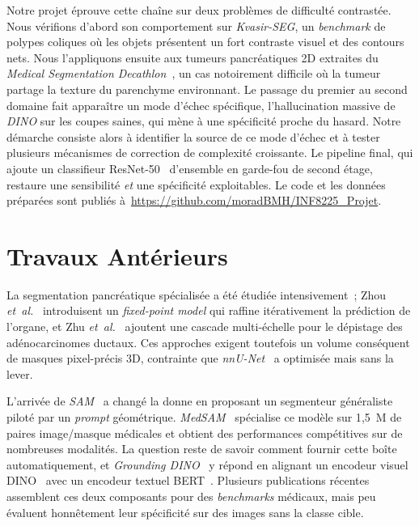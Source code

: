 \documentclass{article}
\begin{document}
Notre projet \'eprouve cette cha\^ine sur deux probl\`emes de difficult\'e
contrast\'ee. Nous v\'erifions d'abord son comportement sur \emph{Kvasir-SEG},
un \emph{benchmark} de polypes coliques o\`u les objets pr\'esentent un fort
contraste visuel et des contours nets. Nous l'appliquons ensuite aux tumeurs
pancr\'eatiques 2D extraites du \emph{Medical Segmentation
Decathlon}~\cite{antonelli2022msd}, un cas notoirement difficile o\`u la
tumeur partage la texture du parenchyme environnant. Le passage du premier au
second domaine fait appara\^itre un mode d'\'echec sp\'ecifique, l'hallucination
massive de \emph{DINO} sur les coupes saines, qui m\`ene \`a une sp\'ecificit\'e
proche du hasard. Notre d\'emarche consiste alors \`a identifier la source de
ce mode d'\'echec et \`a tester plusieurs m\'ecanismes de correction de
complexit\'e croissante. Le pipeline final, qui ajoute un classifieur
ResNet-50~\cite{he2016resnet} d'ensemble en garde-fou de second \'etage,
restaure une sensibilit\'e \emph{et} une sp\'ecificit\'e exploitables. Le
code et les donn\'ees pr\'epar\'ees sont publi\'es \`a~\url{https://github.com/moradBMH/INF8225_Projet}.

\section{Travaux Ant\'erieurs}

La segmentation pancr\'eatique sp\'ecialis\'ee a \'et\'e \'etudi\'ee
intensivement~; Zhou \emph{et~al.}~ introduisent
un \emph{fixed-point model} qui raffine it\'erativement la pr\'ediction de
l'organe, et Zhu \emph{et~al.}~ ajoutent une cascade
multi-\'echelle pour le d\'epistage des ad\'enocarcinomes ductaux. Ces approches
exigent toutefois un volume cons\'equent de masques pixel-pr\'ecis 3D,
contrainte que \emph{nnU-Net}~\cite{isensee2021nnunet} a optimis\'ee mais sans
la lever.

L'arriv\'ee de \emph{SAM}~\cite{kirillov2023sam} a chang\'e la donne en
proposant un segmenteur g\'en\'eraliste pilot\'e par un \emph{prompt}
g\'eom\'etrique. \emph{MedSAM}~\cite{ma2024medsam} sp\'ecialise ce mod\`ele sur
1{,}5~M de paires image/masque m\'edicales et obtient des performances
comp\'etitives sur de nombreuses modalit\'es. La question reste de savoir
comment fournir cette bo\^ite automatiquement, et \emph{Grounding
DINO}~\cite{liu2024groundingdino} y r\'epond en alignant un encodeur visuel
DINO~\cite{caron2021dino} avec un encodeur textuel BERT~\cite{devlin2019bert}.
Plusieurs publications r\'ecentes assemblent ces deux composants pour des
\emph{benchmarks} m\'edicaux, mais peu \'evaluent honn\^etement leur
sp\'ecificit\'e sur des images sans la classe cible.
\end{document}
